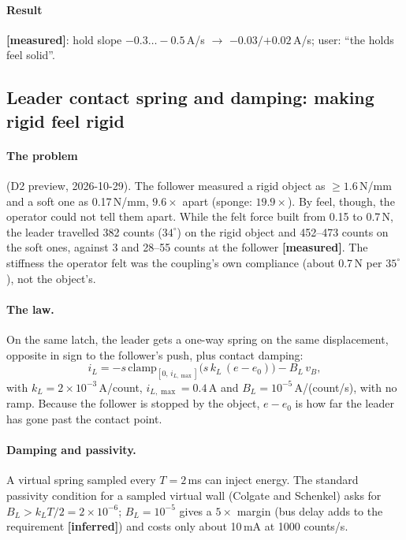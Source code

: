 \documentclass[11pt,a4paper]{article}
\newcommand{\A}{\,\mathrm{A}}
\newcommand{\measured}{\textcolor{teal!70!black}{\textbf{[measured]}}}
\newcommand{\inferred}{\textcolor{orange!80!black}{\textbf{[inferred]}}}
\begin{document}
\paragraph{Result} \measured: hold slope $-0.3\ldots-0.5$\,A/s $\to$
$-0.03/{+0.02}$\,A/s; user: ``the holds feel solid''.

\subsection{Leader contact spring and damping: making rigid feel rigid}
\label{sec:leaderspring}

\paragraph{The problem} (D2 preview, 2026-10-29). The follower measured a
rigid object as $\geq 1.6$\,N/mm and a soft one as 0.17\,N/mm, $9.6\times$
apart (sponge: $19.9\times$). By feel, though, the operator could not tell
them apart. While the felt force built from 0.15 to 0.7\,N, the leader
travelled 382 counts ($34^\circ$) on the rigid object and 452--473 counts
on the soft ones, against 3 and 28--55 counts at the follower \measured.
The stiffness the operator felt was the coupling's own compliance (about
0.7\,N per $35^\circ$), not the object's.

\paragraph{The law.} On the same latch, the leader gets a one-way spring on
the same displacement, opposite in sign to the follower's push, plus
contact damping:
\begin{equation}
  i_L = -s\,\mathrm{clamp}_{[0,\,i_{L,\max}]}\bigl(s\,k_L\,(e - e_0)\bigr) - B_L\,v_B,
\end{equation}
with $k_L = 2\times10^{-3}$\,A/count, $i_{L,\max} = 0.4\A$ and
$B_L = 10^{-5}$\,A/(count/s), with no ramp. Because the follower is stopped
by the object, $e - e_0$ is how far the leader has gone past the contact
point.

\paragraph{Damping and passivity.} A virtual spring sampled every
$T = 2$\,ms can inject energy. The standard passivity condition for a
sampled virtual wall (Colgate and Schenkel) asks for
$B_L > k_L T/2 = 2\times10^{-6}$; $B_L = 10^{-5}$ gives a $5\times$ margin
(bus delay adds to the requirement \inferred) and costs only about 10\,mA at
1000 counts/s.
\end{document}

